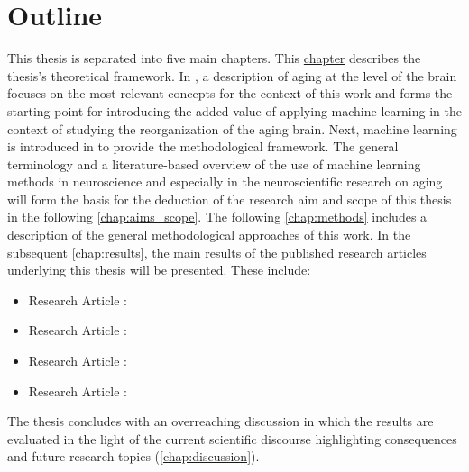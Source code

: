 \section{Outline}
This thesis is separated into five main chapters. This \hyperref[chap:intro]{chapter} describes the thesis's theoretical framework. In , a description of aging at the level of the brain focuses on the most relevant concepts for the context of this work and forms the starting point for introducing the added value of applying machine learning in the context of studying the reorganization of the aging brain. Next, machine learning is introduced in  to provide the methodological framework. The general terminology and a literature-based overview of the use of machine learning methods in neuroscience and especially in the neuroscientific research on aging will form the basis for the deduction of the research aim and scope of this thesis in the following \autoref{chap:aims_scope}. The following \autoref{chap:methods} includes a description of the general methodological approaches of this work. In the subsequent \autoref{chap:results}, the main results of the published research articles underlying this thesis will be presented. These include:

\begin{itemize}
\item Research Article :\\ \hyperref[pub:paperI]{}
\newpage
\item Research Article :\\ \hyperref[pub:paperI]{}
\item Research Article :\\ \hyperref[pub:paperI]{}
\item Research Article :\\ \hyperref[pub:paperI]{}
\end{itemize}

\noindent The thesis concludes with an overreaching discussion in which the results are evaluated in the light of the current scientific discourse highlighting consequences and future research topics (\autoref{chap:discussion}). 

